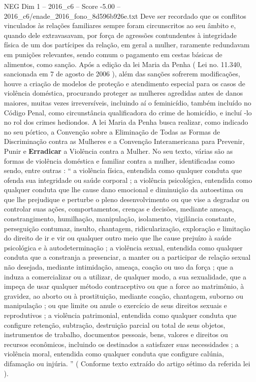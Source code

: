 \begin{textsample}{NEG Dim 1 – 2016\_c6 – Score -5.00 – 2016\_c6/enade\_2016\_fono\_8d596b926e.txt}
Deve ser recordado que os conflitos vinculados às relações familiares sempre foram circunscritos ao seu âmbito e, quando dele extravasavam, por força de agressões contundentes à integridade física de um dos partícipes da relação, em geral a mulher, raramente redundavam em punições relevantes, sendo comum o pagamento em cestas básicas de alimentos, como sanção.
Após a edição da lei Maria da Penha ( Lei no. 11.340, sancionada em 7 de agosto de 2006 ), além das sanções sofrerem modificações, houve a criação de modelos de proteção e atendimento especial para os casos de violência doméstica, procurando proteger as mulheres agredidas antes de danos maiores, muitas vezes irreversíveis, incluindo aí o feminicídio, também incluído no Código Penal, como circunstância qualificadora do crime de homicídio, e incluí -lo no rol dos crimes hediondos.
A lei Maria da Penha busca realizar, como indicado no seu pórtico, a Convenção sobre a Eliminação de Todas as Formas de Discriminação contra as Mulheres e a Convenção Interamericana para Prevenir, Punir e \textbf{Erradicar} a Violência contra a Mulher.
No seu texto, várias são as formas de violência doméstica e familiar contra a mulher, identificadas como sendo, entre outras : “ a violência física, entendida como qualquer conduta que ofenda sua integridade ou saúde corporal ; a violência psicológica, entendida como qualquer conduta que lhe cause dano emocional e diminuição da autoestima ou que lhe prejudique e perturbe o pleno desenvolvimento ou que vise a degradar ou controlar suas ações, comportamentos, crenças e decisões, mediante ameaça, constrangimento, humilhação, manipulação, isolamento, vigilância constante, perseguição contumaz, insulto, chantagem, ridicularização, exploração e limitação do direito de ir e vir ou qualquer outro meio que lhe cause prejuízo à saúde psicológica e à autodeterminação ; a violência sexual, entendida como qualquer conduta que a constranja a presenciar, a manter ou a participar de relação sexual não desejada, mediante intimidação, ameaça, coação ou uso da força ; que a induza a comercializar ou a utilizar, de qualquer modo, a sua sexualidade, que a impeça de usar qualquer método contraceptivo ou que a force ao matrimônio, à gravidez, ao aborto ou à prostituição, mediante coação, chantagem, suborno ou manipulação ; ou que limite ou anule o exercício de seus direitos sexuais e reprodutivos ; a violência patrimonial, entendida como qualquer conduta que configure retenção, subtração, destruição parcial ou total de seus objetos, instrumentos de trabalho, documentos pessoais, bens, valores e direitos ou recursos econômicos, incluindo os destinados a satisfazer suas necessidades ; a violência moral, entendida como qualquer conduta que configure calúnia, difamação ou injúria. ” ( Conforme texto extraído do artigo sétimo da referida lei ).

\end{textsample}
